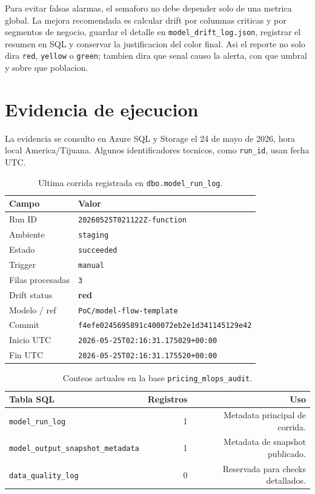 \documentclass[11pt,letterpaper]{article}
\newcommand{\code}[1]{\texttt{\small #1}}
\begin{document}
Para evitar falsas alarmas, el semaforo no debe depender solo de una metrica global. La mejora recomendada es calcular drift por columnas criticas y por segmentos de negocio, guardar el detalle en \code{model\_drift\_log.json}, registrar el resumen en SQL y conservar la justificacion del color final. Asi el reporte no solo dira \code{red}, \code{yellow} o \code{green}; tambien dira que senal causo la alerta, con que umbral y sobre que poblacion.

\section*{Evidencia de ejecucion}

La evidencia se consulto en Azure SQL y Storage el 24 de mayo de 2026, hora local America/Tijuana. Algunos identificadores tecnicos, como \code{run\_id}, usan fecha UTC.

\begin{table}[h!]
\centering
\begin{tabular}{ll}
\toprule
\textbf{Campo} & \textbf{Valor}\\
\midrule
Run ID & \code{20260525T021122Z-function}\\
Ambiente & \code{staging}\\
Estado & \code{succeeded}\\
Trigger & \code{manual}\\
Filas procesadas & \code{3}\\
Drift status & \textcolor{rojo}{\textbf{red}}\\
Modelo / ref & \code{PoC/model-flow-template}\\
Commit & \code{f4efe0245695891c400072eb2e1d341145129e42}\\
Inicio UTC & \code{2026-05-25T02:16:31.175029+00:00}\\
Fin UTC & \code{2026-05-25T02:16:31.175520+00:00}\\
\bottomrule
\end{tabular}
\caption{Ultima corrida registrada en \code{dbo.model\_run\_log}.}
\end{table}

\begin{table}[h!]
\centering
\begin{tabular}{lrr}
\toprule
\textbf{Tabla SQL} & \textbf{Registros} & \textbf{Uso}\\
\midrule
\code{model\_run\_log} & 1 & Metadata principal de corrida.\\
\code{model\_output\_snapshot\_metadata} & 1 & Metadata de snapshot publicado.\\
\code{data\_quality\_log} & 0 & Reservada para checks detallados.\\
\bottomrule
\end{tabular}
\caption{Conteos actuales en la base \code{pricing\_mlops\_audit}.}
\end{table}
\end{document}
